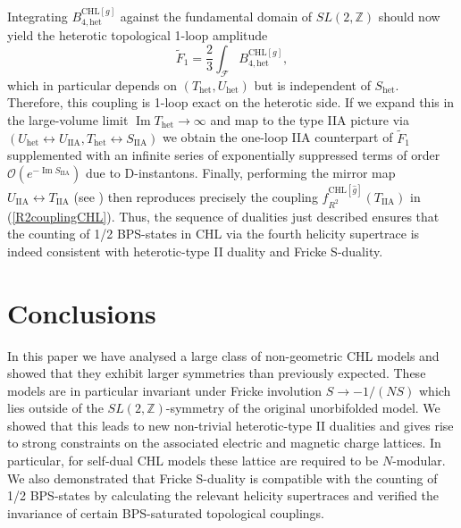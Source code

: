 \documentclass[a4paper,11pt]{article}
\DeclareMathOperator{\im}{Im}
\numberwithin{equation}{section}
\def\be{\begin{equation}}
\def\ee{\end{equation}}
\begin{document}
Integrating $ B^{\text{CHL}[g]}_{4, \text{het}}$ against the fundamental domain of $SL(2,\mathbb{Z})$ should now yield the heterotic topological 1-loop amplitude \cite{Antoniadis:1997zt}
\be
\tilde{F}_1=\frac{2}{3}\int_{\mathcal{F}}  B^{\text{CHL}[g]}_{4, \text{het}},
\ee
which in particular depends on $(T_{\text{het}}, U_{\text{het}})$ but is independent of $S_{\text{het}}$. Therefore, this coupling is 1-loop exact on the heterotic side. If we expand this in the large-volume limit $\im T_{\text{het}}\to \infty$ and map to the type IIA picture via $(U_{\text{het}} \leftrightarrow U_{\text{IIA}}, T_{\text{het}} \leftrightarrow S_{\text{IIA}})$ we obtain  the one-loop IIA counterpart of $\tilde{F}_1$ supplemented with an infinite series of exponentially suppressed terms of order $\mathcal{O}(e^{-\im S_{\text{IIA}}})$ due to D-instantons. Finally, performing the mirror map $U_{\text{IIA}} \leftrightarrow T_{\text{IIA}}$ (see \cite{Antoniadis:1997zt}) then reproduces precisely the coupling $f^{\text{CHL}[\hat g]}_{R^2}(T_{\text{IIA}})$ in (\ref{R2couplingCHL}). Thus, the sequence of dualities just described ensures that the counting of 1/2 BPS-states in CHL via the fourth helicity supertrace is indeed consistent with heterotic-type II duality and Fricke S-duality. 



\section{Conclusions}
\label{sec:conclusions}
In this paper we have analysed a large class of non-geometric CHL models and showed that they exhibit larger symmetries than previously expected. These models are in particular invariant under Fricke involution $S\to -1/(NS)$ which lies outside of the $SL(2,\mathbb{Z})$-symmetry of the original unorbifolded model. We showed that this leads to new non-trivial heterotic-type II dualities and gives rise to strong constraints on the associated electric and magnetic charge lattices. In particular, for self-dual CHL models these lattice are required to be $N$-modular. We also demonstrated that Fricke S-duality is compatible with the counting of 1/2 BPS-states by calculating the relevant helicity supertraces and verified the invariance of certain BPS-saturated topological couplings.
\end{document}
